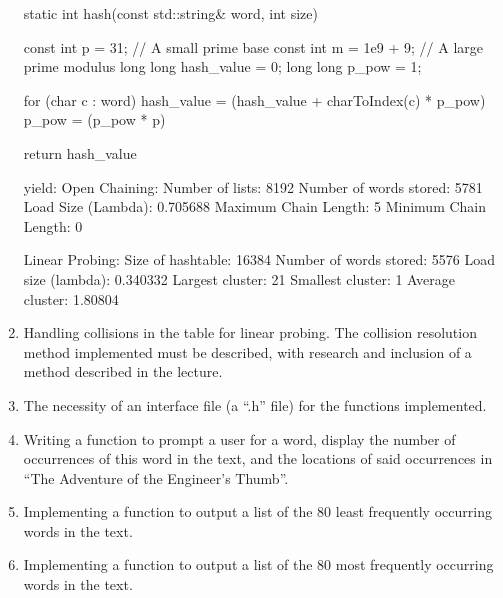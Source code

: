 \documentclass[12pt]{article}
\begin{document}
\begin{enumerate}
static int hash(const std::string& word, int size) {
    const int p = 31; // A small prime base
    const int m = 1e9 + 9; // A large prime modulus
    long long hash_value = 0;
    long long p_pow = 1;

    for (char c : word) {
        hash_value = (hash_value + charToIndex(c) * p_pow) %
        p_pow = (p_pow * p) %
    }

    return hash_value %
}

yield:
Open Chaining:
Number of lists: 8192
Number of words stored: 5781
Load Size (Lambda): 0.705688
Maximum Chain Length: 5
Minimum Chain Length: 0

Linear Probing:
Size of hashtable: 16384
Number of words stored: 5576
Load size (lambda): 0.340332
Largest cluster: 21
Smallest cluster: 1
Average cluster: 1.80804



\item
Handling collisions in the table for linear probing. The collision resolution method implemented must be
described, with research and inclusion of a method described in the lecture.

\item
The necessity of an interface file (a “.h” file) for the functions implemented.

\item
Writing a function to prompt a user for a word, display the number of occurrences of this word in the
text, and the locations of said occurrences in “The Adventure of the Engineer’s Thumb”.

\item
Implementing a function to output a list of the 80 least frequently occurring words in the text.

\item
Implementing a function to output a list of the 80 most frequently occurring words in the text.
\end{enumerate}
\end{document}
